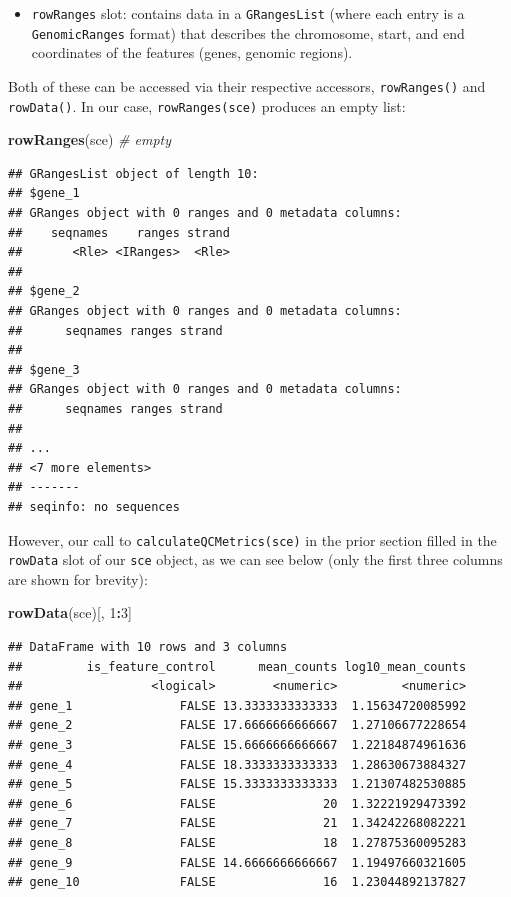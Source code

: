 \documentclass[]{book}
\newenvironment{Shaded}{\begin{snugshade}}{\end{snugshade}}
\newcommand{\CommentTok}[1]{\textcolor[rgb]{0.56,0.35,0.01}{\textit{#1}}}
\newcommand{\DecValTok}[1]{\textcolor[rgb]{0.00,0.00,0.81}{#1}}
\newcommand{\KeywordTok}[1]{\textcolor[rgb]{0.13,0.29,0.53}{\textbf{#1}}}
\newcommand{\NormalTok}[1]{#1}
\newcommand{\OperatorTok}[1]{\textcolor[rgb]{0.81,0.36,0.00}{\textbf{#1}}}
\providecommand{\tightlist}{%
  \setlength{\itemsep}{0pt}\setlength{\parskip}{0pt}}
\begin{document}
\begin{itemize}
\tightlist
\item
  \texttt{rowRanges} slot: contains data in a \texttt{GRangesList} (where each entry is a \texttt{GenomicRanges} format) that describes the chromosome, start, and end coordinates of the features (genes, genomic regions).
\end{itemize}

Both of these can be accessed via their respective accessors, \texttt{rowRanges()} and \texttt{rowData()}. In our case, \texttt{rowRanges(sce)} produces an empty list:

\begin{Shaded}
\begin{Highlighting}[]
\KeywordTok{rowRanges}\NormalTok{(sce) }\CommentTok{# empty}
\end{Highlighting}
\end{Shaded}

\begin{verbatim}
## GRangesList object of length 10:
## $gene_1 
## GRanges object with 0 ranges and 0 metadata columns:
##    seqnames    ranges strand
##       <Rle> <IRanges>  <Rle>
## 
## $gene_2 
## GRanges object with 0 ranges and 0 metadata columns:
##      seqnames ranges strand
## 
## $gene_3 
## GRanges object with 0 ranges and 0 metadata columns:
##      seqnames ranges strand
## 
## ...
## <7 more elements>
## -------
## seqinfo: no sequences
\end{verbatim}

However, our call to \texttt{calculateQCMetrics(sce)} in the prior section filled in the \texttt{rowData} slot of our \texttt{sce} object, as we can see below (only the first three columns are shown for brevity):

\begin{Shaded}
\begin{Highlighting}[]
\KeywordTok{rowData}\NormalTok{(sce)[, }\DecValTok{1}\OperatorTok{:}\DecValTok{3}\NormalTok{]}
\end{Highlighting}
\end{Shaded}

\begin{verbatim}
## DataFrame with 10 rows and 3 columns
##         is_feature_control      mean_counts log10_mean_counts
##                  <logical>        <numeric>         <numeric>
## gene_1               FALSE 13.3333333333333  1.15634720085992
## gene_2               FALSE 17.6666666666667  1.27106677228654
## gene_3               FALSE 15.6666666666667  1.22184874961636
## gene_4               FALSE 18.3333333333333  1.28630673884327
## gene_5               FALSE 15.3333333333333  1.21307482530885
## gene_6               FALSE               20  1.32221929473392
## gene_7               FALSE               21  1.34242268082221
## gene_8               FALSE               18  1.27875360095283
## gene_9               FALSE 14.6666666666667  1.19497660321605
## gene_10              FALSE               16  1.23044892137827
\end{verbatim}
\end{document}
